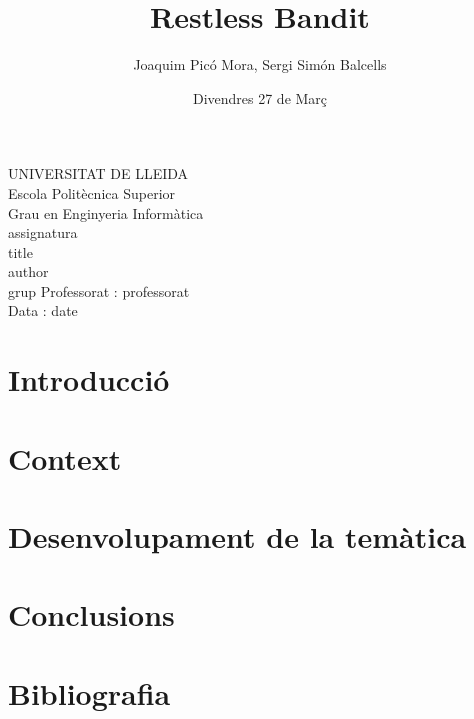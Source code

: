 \documentclass{article}
\title{Restless Bandit}
\author{Joaquim Picó Mora, Sergi Simón Balcells}
\date{Divendres 27 de Març}
\renewcommand{\maketitle}{ %
	\begin{titlepage}
		\raggedright{UNIVERSITAT DE LLEIDA \\
			Escola Politècnica Superior \\
			Grau en Enginyeria Informàtica\\
			\1assignatura\\}
		\vspace{5cm}
		\centering\huge{\5title \\}
		\vspace{3cm}
		\large{\6author} \\
		\normalsize{\3grup}
		\vfill
		Professorat : \4professorat \\
		Data : \7date
\end{titlepage}}
\begin{document}
	\maketitle
	\thispagestyle{empty}
	
	\newpage
	\tableofcontents
	\newpage
	\section{Introducció}
	\section{Context}
	
	\section{Desenvolupament de la temàtica}
	
	\section{Conclusions}
	\section{Bibliografia}
	
\end{document}
